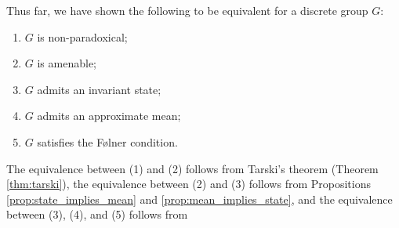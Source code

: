 Thus far, we have shown the following to be equivalent for a discrete group $G$:
\begin{enumerate}[(1)]
  \item $G$ is non-paradoxical;
  \item $G$ is amenable;
  \item $G$ admits an invariant state;
  \item $G$ admits an approximate mean;
  \item $G$ satisfies the Følner condition.
\end{enumerate}
The equivalence between (1) and (2) follows from Tarski's theorem (Theorem \ref{thm:tarski}), the equivalence between (2) and (3) follows from Propositions \ref{prop:state_implies_mean} and \ref{prop:mean_implies_state}, and the equivalence between (3), (4), and (5) follows from 
